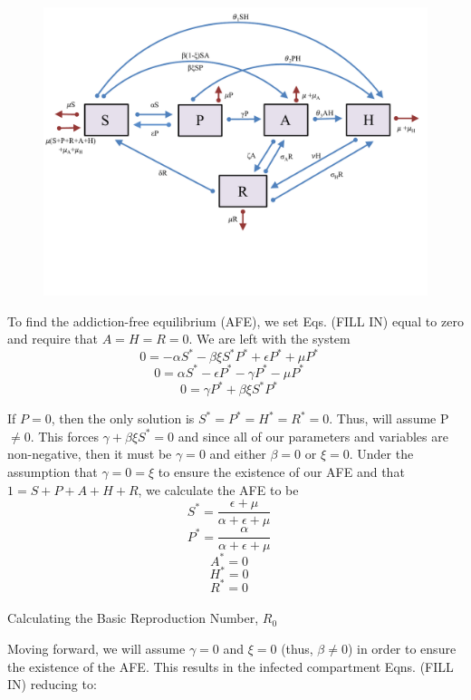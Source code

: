 \documentclass[12pt]{article}
\begin{document}
\begin{figure}
\includegraphics[scale=0.66]{heroin_schematic.pdf}
\end{figure}


To find the addiction-free equilibrium (AFE), we set Eqs. (FILL IN) equal to zero and require that $A=H=R=0$. We are left with the system \\

\[0=-\alpha S^* -\beta \xi S^* P^* + \epsilon P^* +\mu P^* \quad\]
\[0=\alpha S^* - \epsilon P^* -\gamma P^* - \mu P^* \quad\]
\[0=\gamma P^* + \beta \xi S^* P^*   \quad\]



If $P=0$, then the only solution is $S^*=P^*=H^*=R^*=0$. Thus, will assume P $\neq 0. $ This forces $\gamma + \beta \xi S^* =0$ and since all of our parameters and variables are non-negative, then it must be $\gamma=0$ and either $\beta=0$ or $\xi=0$. Under the assumption that $\gamma=0=\xi$ to ensure the existence of our AFE and that $1=S+P+A+H+R$, we calculate the AFE to be \\

\[S^*=\frac{\epsilon + \mu}{\alpha + \epsilon +\mu}\quad\]
\[P^*=\frac{\alpha}{\alpha + \epsilon +\mu}\quad\]
\[A^*=0\quad\]
\[H^*=0\quad\]
\[R^*=0\quad\] \\




Calculating the Basic Reproduction Number, $R_0$

Moving forward, we will assume $\gamma =0$ and $\xi =0$ (thus, $\beta \neq 0$) in order to ensure the existence of the AFE. This results in the infected compartment Eqns. (FILL IN) reducing to:
\end{document}
